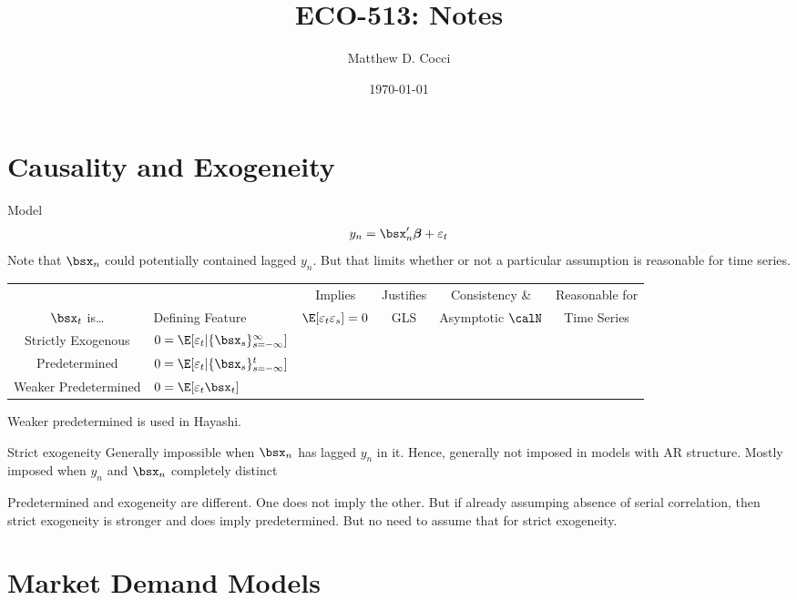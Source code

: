 \documentclass[12pt]{article}
\author{Matthew D. Cocci}
\title{ECO-513: Notes}
\date{\today}
\theoremstyle{plain}
\theoremstyle{definition}
\theoremstyle{remark}
\newcommand{\bsbeta}{\boldsymbol{\beta}}
\newcommand{\cmark}{\text{\ding{51}}}
\newcommand{\xmark}{\text{\ding{55}}}
\begin{document}
\maketitle

\tableofcontents


\clearpage
\section{Causality and Exogeneity}

Model
\begin{align*}
  y_n
  = \bsx_n'\bsbeta + \varepsilon_t
\end{align*}
Note that $\bsx_n$ could potentially contained lagged $y_n$. But that
limits whether or not a particular assumption is reasonable for time
series.
\begin{table}[htbp!]
\centering
\begin{tabular}{c|lcccc}
    &
    & Implies
    & Justifies
    & Consistency \&
    & Reasonable for
  \\
  $\bsx_t$ is\dots
    & Defining Feature
    & $\E[\varepsilon_t\varepsilon_{s}]=0$
    & GLS
    & Asymptotic $\calN$
    & Time Series
  \\\hline\hline
  Strictly Exogenous
    & $0=\E[\varepsilon_t|\{\bsx_s\}_{s=-\infty}^\infty]$
    & \xmark
    & \cmark
    & \cmark
    & \xmark
  \\
  Predetermined
    & $0=\E[\varepsilon_t|\{\bsx_s\}_{s=-\infty}^t]$
    & \cmark
    & \xmark
    & \cmark
    & \cmark
  \\
  Weaker Predetermined
    & $0=\E[\varepsilon_t\bsx_t]$
    & \xmark
    & \xmark
    & \cmark
    & \cmark
\end{tabular}
\end{table}

Weaker predetermined is used in Hayashi.

Strict exogeneity Generally impossible when $\bsx_n$ has lagged $y_n$ in
it.  Hence, generally not imposed in models with AR structure.
Mostly imposed when $y_n$ and $\bsx_n$ completely distinct

Predetermined and exogeneity are different. One does not imply the
other.
But if already assumping absence of serial correlation, then strict
exogeneity is stronger and does imply predetermined.
But no need to assume that for strict exogeneity.


\clearpage
\section{Market Demand Models}
\end{document}
